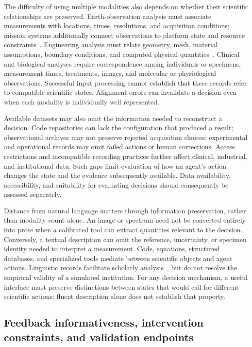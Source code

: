 The difficulty of using multiple modalities also depends on whether their scientific relationships are preserved. Earth-observation analysis must associate measurements with locations, times, resolutions, and acquisition conditions; mission systems additionally connect observations to platform state and resource constraints~\cite{asd0650,asd0645}. Engineering analysis must relate geometry, mesh, material assumptions, boundary conditions, and computed physical quantities~\cite{asd0047,asd0128}. Clinical and biological analyses require correspondence among individuals or specimens, measurement times, treatments, images, and molecular or physiological observations. Successful input processing cannot establish that these records refer to compatible scientific states. Alignment errors can invalidate a decision even when each modality is individually well represented.

Available datasets may also omit the information needed to reconstruct a decision. Code repositories can lack the configuration that produced a result; observational archives may not preserve rejected acquisition choices; experimental and operational records may omit failed actions or human corrections. Access restrictions and incompatible recording practices further affect clinical, industrial, and institutional data. Such gaps limit evaluation of how an agent's action changes the state and the evidence subsequently available. Data availability, accessibility, and suitability for evaluating decisions should consequently be assessed separately.

Distance from natural language matters through information preservation, rather than modality count alone. An image or spectrum need not be converted entirely into prose when a calibrated tool can extract quantities relevant to the decision. Conversely, a textual description can omit the reference, uncertainty, or specimen identity needed to interpret a measurement. Code, equations, structured databases, and specialized tools mediate between scientific objects and agent actions. Linguistic records facilitate scholarly analysis~\cite{asd0624}, but do not resolve the empirical validity of a simulated institution. For any decision mechanism, a useful interface must preserve distinctions between states that would call for different scientific actions; fluent description alone does not establish that property.

\subsection{Feedback informativeness, intervention constraints, and validation endpoints}

